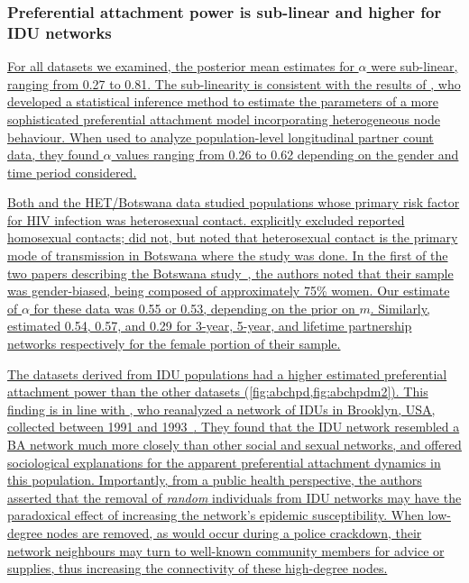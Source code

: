 \documentclass[12pt]{article}\usepackage[]{graphicx}\usepackage[]{color}
\let\mref\cref
\let\mciteauthor\citeauthor
\renewcommand{\cref}[1]{\mbox{\mref{#1}}}
\renewcommand{\citeauthor}[1]{\mbox{\mciteauthor{#1}}}
\newcommand{\add}[1]{\color{blue} \uline{#1} \color{black}}
\begin{document}
\subsubsection*{Preferential attachment power is sub-linear and higher for IDU networks}

\add{For all datasets we examined, the posterior mean estimates for $\alpha$
were sub-linear, ranging from 
    0.27
to 
    0.81.
The sub-linearity is consistent with the results of
\textcite{de2007preferential}, who developed a statistical inference method to
estimate the parameters of a more sophisticated preferential attachment model
incorporating heterogeneous node behaviour. When used to analyze
population-level longitudinal partner count data, they found $\alpha$ values
ranging from 0.26 to 0.62 depending on the gender and time period considered.}

\add{Both \textcite{de2007preferential} and the HET/Botswana data studied
populations whose primary risk factor for HIV infection was heterosexual
contact. \citeauthor{de2007preferential} explicitly excluded reported
homosexual contacts; \citeauthor{novitsky2014impact} did not, but noted that
heterosexual contact is the primary mode of transmission in Botswana where the
study was done. In the first of the two papers describing the Botswana
study~\autocite{novitsky2013phylogenetic}, the authors noted that their sample
was gender-biased, being composed of approximately 75\% women. Our estimate of
$\alpha$ for these data was 
    0.55
        or 
    0.53,
depending on the prior on $m$. Similarly, \textcite{de2007preferential}
estimated 0.54, 0.57, and 0.29 for 3-year, 5-year, and lifetime partnership
networks respectively for the female portion of their sample.}

\add{The datasets derived from IDU populations had a higher estimated
preferential attachment power than the other datasets
(\cref{fig:abchpd,fig:abchpdm2}). This finding is in line with
\textcite{dombrowski2013topological}, who reanalyzed a network of IDUs in
Brooklyn, USA, collected between 1991 and 1993~\autocite{friedman2006social}.
They found that the IDU network resembled a BA network much more closely than
other social and sexual networks, and offered sociological explanations for the
apparent preferential attachment dynamics in this population. Importantly, from
a public health perspective, the authors asserted that the removal of
\emph{random} individuals from IDU networks may have the paradoxical effect of
increasing the network's epidemic susceptibility. When low-degree nodes are
removed, as would occur during a police crackdown, their network neighbours may
turn to well-known community members for advice or supplies, thus increasing
the connectivity of these high-degree nodes.}
\end{document}
